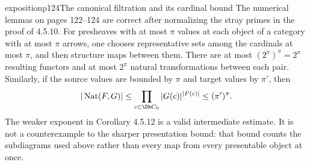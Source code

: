 \begin{dcomment}{exposition}{p124}{The canonical filtration and its cardinal bound}
The numerical lemmas on pages 122--124 are correct after normalizing the stray primes in the proof of 4.5.10. For presheaves with at most $\pi$ values at each object of a category with at most $\pi$ arrows, one chooses representative sets among the cardinals at most $\pi$, and then structure maps between them. There are at most $(2^\pi)^\pi=2^\pi$ resulting functors and at most $2^\pi$ natural transformations between each pair. Similarly, if the source values are bounded by $\pi$ and target values by $\pi'$, then
\[
 |\operatorname{Nat}(F,G)|\leq
 \prod_{c\in\Ob C_0}|G(c)|^{|F(c)|}
 \leq(\pi')^\pi.
\]
The weaker exponent in Corollary 4.5.12 is a valid intermediate estimate. It is not a counterexample to the sharper presentation bound: that bound counts the subdiagrams used above rather than every map from every presentable object at once.
\end{dcomment}

